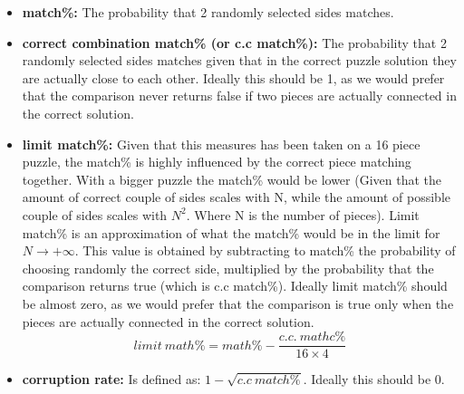 \documentclass{article}
\begin{document}
\begin{itemize}
  \item \textbf{match\%:}\newline
  The probability that 2 randomly selected sides matches.
  
  \item \textbf{correct combination match\% (or c.c match\%):}\newline
  The probability that 2 randomly selected sides matches given that in the correct puzzle
  solution they are actually close to each other. Ideally this should be 1, as we would prefer
  that the comparison never returns false if two pieces are actually connected in the correct solution.
  
  \item \textbf{limit match\%:}\newline
  Given that this measures has been taken on a 16 piece puzzle,
  the match\% is highly influenced by the correct piece matching together.
  With a bigger puzzle the match\% would be lower (Given that the amount
  of correct couple of sides scales with N, while the amount of
  possible couple of sides scales with \(N^2\). Where N is the number of pieces).\newline
  Limit match\% is an approximation of what the match\%
  would be in the limit for \(N \rightarrow + \infty\).
  This value is obtained by subtracting to match\%
  the probability of choosing randomly the correct side,
  multiplied by the probability that the comparison returns true
  (which is c.c match\%).\newline
  Ideally limit match\% should be almost zero, as we would prefer that the comparison is true only when
  the pieces are actually connected in the correct solution.
  \[limit \: math\% = math\% - \frac{c.c. \: mathc\%}{16 \times 4}\]
  
  \item \textbf{corruption rate:}\newline
  Is defined as: \(1-\sqrt{c.c \: match\%}\). Ideally this should be 0.

\end{itemize}
\end{document}
